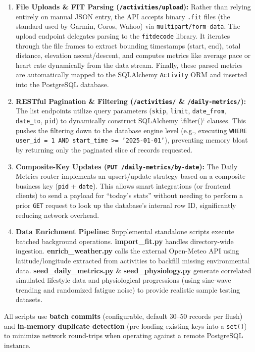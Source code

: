 \documentclass[10pt,a4paper]{article}
\begin{document}
\begin{enumerate}[leftmargin=1.5em]
  \item \textbf{File Uploads \& FIT Parsing (\texttt{/activities/upload}):} Rather than relying entirely on manual JSON entry, the API accepts binary \texttt{.fit} files (the standard used by Garmin, Coros, Wahoo) via \texttt{multipart/form-data}. The upload endpoint delegates parsing to the \texttt{fitdecode} library. It iterates through the file frames to extract bounding timestamps (start, end), total distance, elevation ascent/descent, and computes metrics like average pace or heart rate dynamically from the data stream. Finally, these parsed metrics are automatically mapped to the SQLAlchemy \texttt{Activity} ORM and inserted into the PostgreSQL database.
  \item \textbf{RESTful Pagination \& Filtering (\texttt{/activities/} \& \texttt{/daily-metrics/}):} The list endpoints utilize query parameters (\texttt{skip}, \texttt{limit}, \texttt{date\_from}, \texttt{date\_to}, \texttt{pid}) to dynamically construct SQLAlchemy `.filter()` clauses. This pushes the filtering down to the database engine level (e.g., executing \texttt{WHERE user\_id = 1 AND start\_time >= '2025-01-01'}), preventing memory bloat by returning only the paginated slice of records requested.
  \item \textbf{Composite-Key Updates (\texttt{PUT /daily-metrics/by-date}):} The Daily Metrics router implements an upsert/update strategy based on a composite business key (\texttt{pid} + \texttt{date}). This allows smart integrations (or frontend clients) to send a payload for ``today's stats'' without needing to perform a prior \texttt{GET} request to look up the database's internal row ID, significantly reducing network overhead.
  \item \textbf{Data Enrichment Pipeline:} Supplemental standalone scripts execute batched background operations. \textbf{import\_fit.py} handles directory-wide ingestion. \textbf{enrich\_weather.py} calls the external Open-Meteo API using latitude/longitude extracted from activities to backfill missing environmental data. \textbf{seed\_daily\_metrics.py} \& \textbf{seed\_physiology.py} generate correlated simulated lifestyle data and physiological progressions (using sine-wave trending and randomized fatigue noise) to provide realistic sample testing datasets.
\end{enumerate}

All scripts use \textbf{batch commits} (configurable, default 30--50 records per flush) and \textbf{in-memory duplicate detection} (pre-loading existing keys into a \texttt{set()}) to minimize network round-trips when operating against a remote PostgreSQL instance.
\end{document}

